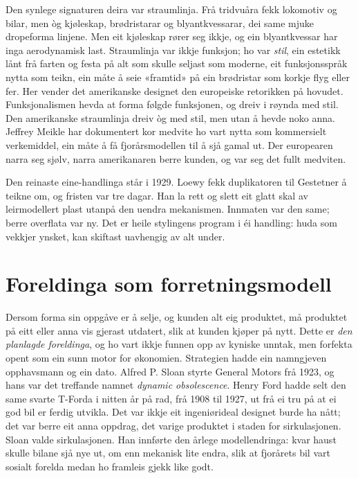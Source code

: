 Den synlege signaturen deira var straumlinja. Frå tridvuåra fekk lokomotiv og bilar, men òg kjøleskap, brødristarar og blyantkvessarar, dei same mjuke dropeforma linjene. Men eit kjøleskap rører seg ikkje, og ein blyantkvessar har inga aerodynamisk last. Straumlinja var ikkje funksjon; ho var \emph{stil}, ein estetikk lånt frå farten og festa på alt som skulle seljast som moderne, eit funksjonsspråk nytta som teikn, ein måte å seie «framtid» på ein brødristar som korkje flyg eller fer. Her vender det amerikanske designet den europeiske retorikken på hovudet. Funksjonalismen hevda at forma følgde funksjonen, og dreiv i røynda med stil. Den amerikanske straumlinja dreiv òg med stil, men utan å hevde noko anna. Jeffrey Meikle har dokumentert kor medvite ho vart nytta som kommersielt verkemiddel, ein måte å få fjorårsmodellen til å sjå gamal ut\autocite{meikle1979}. Der europearen narra seg sjølv, narra amerikanaren berre kunden, og var seg det fullt medviten.

Den reinaste eine-handlinga står i 1929. Loewy fekk duplikatoren til Gestetner å teikne om, og fristen var tre dagar. Han la rett og slett eit glatt skal av leirmodellert plast utanpå den uendra mekanismen. Innmaten var den same; berre overflata var ny. Det er heile stylingens program i éi handling: huda som vekkjer ynsket, kan skiftast uavhengig av alt under.

\section{Foreldinga som forretningsmodell}

Dersom forma sin oppgåve er å selje, og kunden alt eig produktet, må produktet på eitt eller anna vis gjerast utdatert, slik at kunden kjøper på nytt. Dette er \emph{den planlagde foreldinga}, og ho vart ikkje funnen opp av kyniske unntak, men forfekta opent som ein sunn motor for økonomien. Strategien hadde ein namngjeven opphavsmann og ein dato. Alfred P. Sloan styrte General Motors frå 1923, og hans var det treffande namnet \emph{dynamic obsolescence}. Henry Ford hadde selt den same svarte T-Forda i nitten år på rad, frå 1908 til 1927, ut frå ei tru på at ei god bil er ferdig utvikla. Det var ikkje eit ingeniørideal designet burde ha nått; det var berre eit anna oppdrag, det varige produktet i staden for sirkulasjonen. Sloan valde sirkulasjonen. Han innførte den årlege modellendringa: kvar haust skulle bilane sjå nye ut, om enn mekanisk lite endra, slik at fjorårets bil vart sosialt forelda medan ho framleis gjekk like godt.

